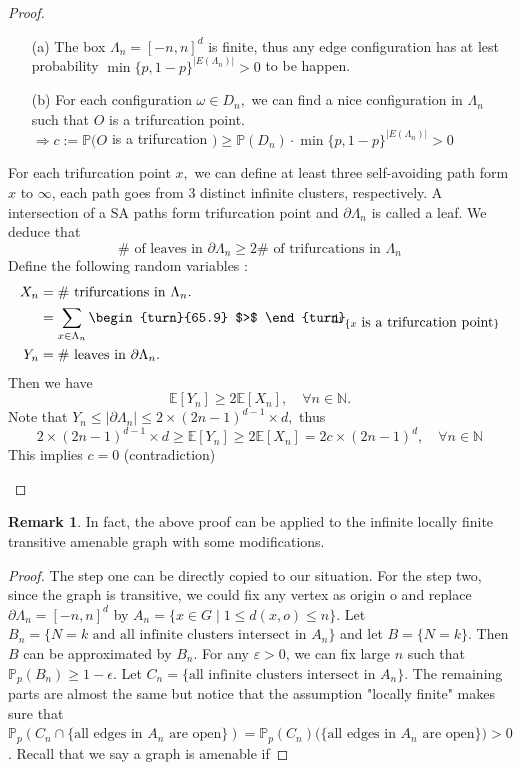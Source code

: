 \documentclass[12pt,a4paper]{report}
\theoremstyle{definition}
\newtheorem*{remark}{Remark}
\newcommand{\indecate}{\mbox{\begin{turn}{65.9}
$>$
\end{turn}\hspace{-10.5pt}\parbox[t][-5pt][c]{10pt}{$\bot$}\hspace{-4.35pt}\parbox[t][-3.4pt][c]{4pt}{$\shortmid$}}}
\begin{document}
\begin{enumerate}
\begin{proof}
\begin{enumerate}
		\begin{enumerate}
		    \item[(a)] The box $\Lambda_n=[-n,n]^d$ is finite, thus any edge configuration has at lest probability $\min\{p,1-p\}^{|E(\Lambda_n)|}>0$ to be happen.
		    \item[(b)] For each configuration $\omega\in D_n,$ we can find a nice configuration in $\Lambda_n$ such that $O$ is a trifurcation point. \\
		    $\Rightarrow c:=\mathbb{P}(O$ is a trifurcation $)\geq \mathbb{P}(D_n)\cdot\min\{p,1-p\}^{|E(\Lambda_n)|}>0$
		\end{enumerate}
		For each trifurcation point $x,$ we can define at least three self-avoiding path form $x$ to $\infty$, each path goes from 3 distinct infinite clusters, respectively. A intersection of a SA paths form trifurcation point and $\partial\Lambda_n$ is called a leaf. We deduce that
		\[
		\# \mbox{ of leaves in }\partial\Lambda_n\geq 2\#\mbox{ of trifurcations in }\Lambda_n
		\]
		Define the following random variables : 
		\begin{align*}
		    X_n&=\#\mbox{ trifurcations in }\Lambda_n.\\
		    &=\sum_{x\in \Lambda_n}\indecate_{\{x\mbox{ is a trifurcation point}\}}\\
		    Y_n&=\#\mbox{ leaves in }\partial\Lambda_n.
		\end{align*}
		Then we have 
		\[
		\mathbb{E}[Y_n]\geq 2\mathbb{E}[X_n],\quad \forall n\in\mathbb{N}.
		\]
		Note that $Y_n\leq |\partial\Lambda_n|\leq 2\times (2n-1)^{d-1}\times d,$ thus
		\[
		2\times (2n-1)^{d-1}\times d\geq \mathbb{E}[Y_n]\geq 2\mathbb{E}[X_n]=2c\times (2n-1)^d,\quad \forall n\in\mathbb{N}
		\]
		This implies $c=0$ (contradiction)
	\end{enumerate}
	\end{proof}
\begin{remark}
In fact, the above proof can be applied to the infinite locally finite transitive amenable graph with some modifications.
\end{remark}
\begin{proof}
The step one can be directly copied to our situation. For the step two, since the graph is transitive, we could fix any vertex as origin o and replace $\partial\Lambda_n=[-n,n]^d$ by $A_n=\{x\in G\mid 1\leq d(x,o)\leq n\}$. Let $B_n=\{N=k\text{ and all infinite clusters intersect in } A_n\}$ and let $B=\{N=k\}$.
Then $B$ can be approximated by $B_n$. For any $\varepsilon>0$, we can fix large $n$ such that $\mathbb{P}_p(B_n)\geq 1-\epsilon$. Let $C_n=\{\text{all infinite clusters intersect in }A_n\}$. The remaining parts are almost the same but notice that the assumption "locally finite" makes sure that $\mathbb{P}_p(C_n\cap \{\text{all edges in } A_n \text{ are open}\})=\mathbb{P}_p(C_n)\mathbb(\{\text{all edges in } A_n \text{ are open}\})>0$. Recall that we say a graph is amenable if 

\end{proof}
\end{enumerate}
\end{document}
